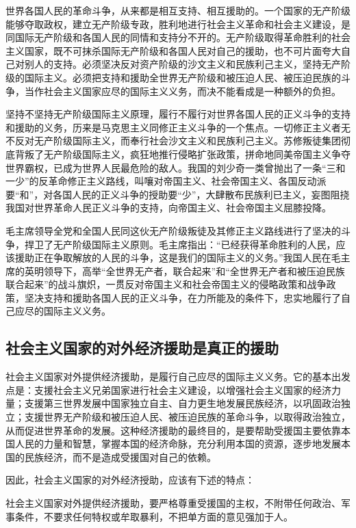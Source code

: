 \documentclass{book}
\begin{document}
世界各国人民的革命斗争，从来都是相互支持、相互援助的。一个国家的无产阶级能够夺取政权，建立无产阶级专政，胜利地进行社会主义革命和社会主义建设，是同国际无产阶级和各国人民的同情和支持分不开的。无产阶级取得革命胜利的社会主义国家，既不可抹杀国际无产阶级和各国人民对自己的援助，也不可片面夸大自己对别人的支持。必须坚决反对资产阶级的沙文主义和民族利己主义，坚持无产阶级的国际主义。必须把支持和援助全世界无产阶级和被压迫人民、被压迫民族的斗争，当作社会主义国家应尽的国际主义义务，而决不能看成是一种额外的负担。

坚持不坚持无产阶级国际主义原理，履行不履行对世界各国人民的正义斗争的支持和援助的义务，历来是马克思主义同修正主义斗争的一个焦点。一切修正主义者无不反对无产阶级国际主义，而奉行社会沙文主义和民族利己主义。苏修叛徒集团彻底背叛了无产阶级国际主义，疯狂地推行侵略扩张政策，拼命地同美帝国主义争夺世界霸权，已成为世界人民最危险的敌人。我国的刘少奇一类曾抛出了一条“三和一少”的反革命修正主义路线，叫嚷对帝国主义、社会帝国主义、各国反动派要“和”，对各国人民的正义斗争的授助要“少”，大肆散布民族利已主义，妄图阻挠我国对世界革命人民正义斗争的支持，向帝国主义、社会帝国主义屈膝投降。

毛主席领导全党和全国人民同这伙无产阶级叛徒及其修正主义路线进行了坚决的斗争，捍卫了无产阶级国际主义原则。毛主席指出：“已经获得革命胜利的人民，应该援助正在争取解放的人民的斗争，这是我们的国际主义的义务。”我国人民在毛主席的英明领导下，高举“全世界无产者，联合起来”和“全世界无产者和被压迫民族联合起来”的战斗旗炽，一贯反对帝国主义和社会帝国主义的侵略政策和战争政策，坚决支持和援助各国人民的正义斗争，在力所能及的条件下，忠实地履行了自己应尽的国际主义义务。

\subsection{社会主义国家的对外经济援助是真正的援助}

社会主义国家对外提供经济援助，是履行自己应尽的国际主义义务。它的基本出发点是：支援社会主义兄弟国家进行社会主义建设，以增强社会主义国家的经济力量；支援第三世界发展中国家独立自主、自力更生地发展民族经济，以巩固政治独立；支援世界无产阶级和被压迫人民、被压迫民族的革命斗争，以取得政治独立，从而促进世界革命的发展。这种经济援助的最终目的，是要帮助受援国主要依靠本国人民的力量和智慧，掌握本国的经济命脉，充分利用本国的资源，逐步地发展本国的民族经济，而不是造成受援国对自己的依赖。

因此，社会主义国家的对外经济授助，应该有下述的特点：

社会主义国家对外提供经济援助，要严格尊重受援国的主权，不附带任何政治、军事条件，不要求任何特权或牟取暴利，不把单方面的意见强加于人。
\end{document}
